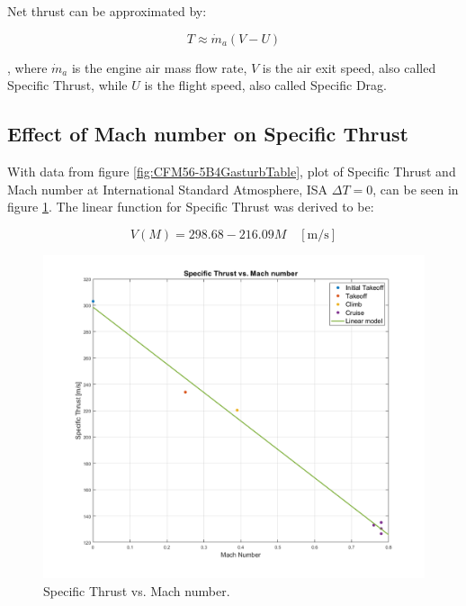 \documentclass[english]{kththesis}
\begin{document}
Net thrust can be approximated by:

\begin{equation}
\label{eq:ThrustSimple}
T \approx \dot{m}_a (V-U)
\end{equation}

, where $\dot{m}_a$ is the engine air mass flow rate, $V$ is the air exit speed, also called Specific Thrust, while $U$ is the flight speed, also called Specific Drag.

\subsection{Effect of Mach number on Specific Thrust}

With data from figure \ref{fig:CFM56-5B4GasturbTable}, plot of Specific Thrust and Mach number at International Standard Atmosphere, ISA $\Delta T=0$, can be seen in figure \ref{fig:STvsM}.
The linear function for Specific Thrust was derived to be:

\begin{equation}
\label{eq:SpecificThrust}
V(M) = 298.68 - 216.09M \quad \mathrm{[m/s]}
\end{equation}

\begin{figure}[hb]
    \centering
    \includegraphics[width=1\textwidth]{Epictures/Specific Thrust vs. Mach number.png}
    \caption{Specific Thrust vs. Mach number.}
    \label{fig:STvsM}
\end{figure}
\end{document}
